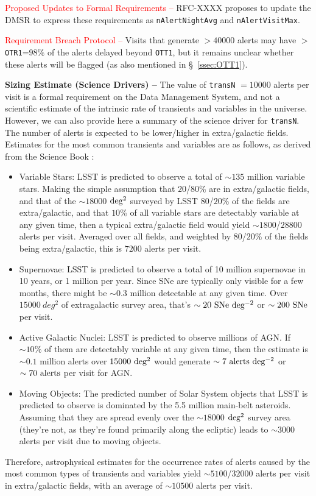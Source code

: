 \documentclass[DM,authoryear,toc]{lsstdoc}
\begin{document}
\textcolor{red}{Proposed Updates to Formal Requirements --} RFC-XXXX proposes to update the DMSR to express these requirements as {\tt nAlertNightAvg} and {\tt nAlertVisitMax}.

\textcolor{red}{Requirement Breach Protocol --} Visits that generate $>40000$ alerts may have $>${\tt OTR1}=$98\%$ of the alerts delayed beyond {\tt OTT1}, but it remains unclear whether these alerts will be flagged (as also mentioned in \S~\ref{ssec:OTT1}). 

{\bf Sizing Estimate (Science Drivers) --} The value of {\tt transN} $=10000$ alerts per visit is a formal requirement on the Data Management System, and not a scientific estimate of the intrinsic rate of transients and variables in the universe. However, we can also provide here a summary of the science driver for {\tt transN}. The number of alerts is expected to be lower/higher in extra/galactic fields. Estimates for the most common transients and variables are as follows, as derived from the Science Book \citep{2009arXiv0912.0201L}:
\begin{itemize}
\item Variable Stars: LSST is predicted to observe a total of $\sim135$ million variable stars. Making the simple assumption that $20$/$80$\% are in extra/galactic fields, and that of the $\sim18000$ $\rm deg^2$ surveyed by LSST $80$/$20$\% of the fields are extra/galactic, and that $10$\% of all variable stars are detectably variable at any given time, then a typical extra/galactic field would yield $\sim1800$/$28800$ alerts per visit. Averaged over all fields, and weighted by $80$/$20$\% of the fields being extra/galactic, this is $7200$ alerts per visit.
\item Supernovae: LSST is predicted to observe a total of 10 million supernovae in 10 years, or 1 million per year. Since SNe are typically only visible for a few months, there might be $\sim0.3$ million detectable at any given time. Over $15000\ deg^{2}$ of extragalactic survey area, that's $\sim20\ {\rm SNe\ deg^{-2}}$ or $\sim200\ {\rm SNe}$ per visit.
\item Active Galactic Nuclei: LSST is predicted to observe millions of AGN. If $\sim10\%$ of them are detectably variable at any given time, then the estimate is $\sim0.1$ million alerts over $15000\ {\rm deg^2}$ would generate $\sim7\ {\rm alerts\ deg^{-2}}$ or $\sim70\ {\rm alerts}$ per visit for AGN.
\item Moving Objects: The predicted number of Solar System objects that LSST is predicted to observe is dominated by the 5.5 million main-belt asteroids. Assuming that they are spread evenly over the $\sim18000$ $\rm deg^2$ survey area (they're not, as they're found primarily along the ecliptic) leads to $\sim3000$ alerts per visit due to moving objects.
\end{itemize} 
Therefore, astrophysical estimates for the occurrence rates of alerts caused by the most common types of transients and variables yield $\sim5100$/$32000$ alerts per visit in extra/galactic fields, with an average of $\sim10500$ alerts per visit.
\end{document}
